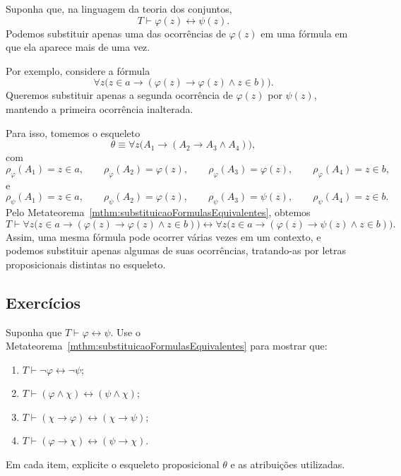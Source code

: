 \begin{example}
    Suponha que, na linguagem da teoria dos conjuntos,
    \[
        T\vdash \varphi(z)\leftrightarrow\psi(z).
    \]
    Podemos substituir apenas uma das ocorrências de $\varphi(z)$ em uma fórmula em que ela aparece mais de uma vez.

    Por exemplo, considere a fórmula
    \[
        \forall z\bigl(z\in a\rightarrow(\varphi(z)\rightarrow\varphi(z)\wedge z\in b)\bigr).
    \]
    Queremos substituir apenas a segunda ocorrência de $\varphi(z)$ por $\psi(z)$, mantendo a primeira ocorrência inalterada.

    Para isso, tomemos o esqueleto
    \[
        \theta \equiv \forall z\bigl(A_1\rightarrow(A_2\rightarrow A_3\wedge A_4)\bigr),
    \]
    com
    \[
        \rho_\varphi(A_1)=z\in a,\qquad
        \rho_\varphi(A_2)=\varphi(z),\qquad
        \rho_\varphi(A_3)=\varphi(z),\qquad
        \rho_\varphi(A_4)=z\in b,
    \]
    e
    \[
        \rho_\psi(A_1)=z\in a,\qquad
        \rho_\psi(A_2)=\varphi(z),\qquad
        \rho_\psi(A_3)=\psi(z),\qquad
        \rho_\psi(A_4)=z\in b.
    \]
    Pelo Metateorema~\ref{mthm:substituicaoFormulasEquivalentes}, obtemos
    \[
        T\vdash
        \forall z\bigl(z\in a\rightarrow(\varphi(z)\rightarrow\varphi(z)\wedge z\in b)\bigr)
        \leftrightarrow
        \forall z\bigl(z\in a\rightarrow(\varphi(z)\rightarrow\psi(z)\wedge z\in b)\bigr).
    \]
    Assim, uma mesma fórmula pode ocorrer várias vezes em um contexto, e podemos substituir apenas algumas de suas ocorrências, tratando-as por letras proposicionais distintas no esqueleto.
\end{example}

\subsection*{Exercícios}

\begin{exercise}
    Suponha que $T\vdash \varphi\leftrightarrow\psi$.
    Use o Metateorema~\ref{mthm:substituicaoFormulasEquivalentes} para mostrar que:
    \begin{enumerate}
        \item $T\vdash \neg\varphi\leftrightarrow\neg\psi$;
        \item $T\vdash (\varphi\wedge\chi)\leftrightarrow(\psi\wedge\chi)$;
        \item $T\vdash (\chi\rightarrow\varphi)\leftrightarrow(\chi\rightarrow\psi)$;
        \item $T\vdash (\varphi\rightarrow\chi)\leftrightarrow(\psi\rightarrow\chi)$.
    \end{enumerate}
    Em cada item, explicite o esqueleto proposicional $\theta$ e as atribuições utilizadas.
\end{exercise}


